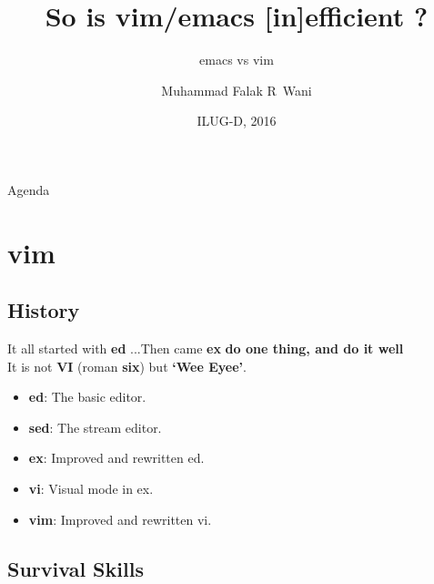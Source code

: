 \documentclass{beamer}
\title{So is vim/emacs [in]efficient ?}
\subtitle{emacs vs vim}
\author{Muhammad Falak R~Wani }
\institute[IIIT-D] %
{
	\inst{}
  Department of Computer Science\\
  IIIT-D
}
\date{ILUG-D, 2016}
\begin{document}
\begin{frame}
	\titlepage
\end{frame}

\begin{frame}{Agenda}
	\tableofcontents
\end{frame}

\section{vim}

\subsection{History}

\begin{frame}{It all started with \textbf{ed} ...}{Then came \textbf{ex}}
	\textbf{do one thing, and do it well}\\ \pause
	It is not \textbf{VI} (roman \textbf{six}) but \textbf{`Wee Eyee'}.\\
	\pause
	\begin{itemize}
		\item {
				\textbf{ed}: The basic editor.
				\pause

			}
		\item {
				\textbf{sed}: The stream editor.
				\pause

			}
		\item {
				\textbf{ex}: Improved and rewritten ed.
				\pause
			}
		\item {
				\textbf{vi}: Visual mode in ex.
				\pause
			}
		\item {
				\textbf{vim}: Improved and rewritten vi.

			}
	\end{itemize}
\end{frame}

\subsection{Survival Skills}
\end{document}
